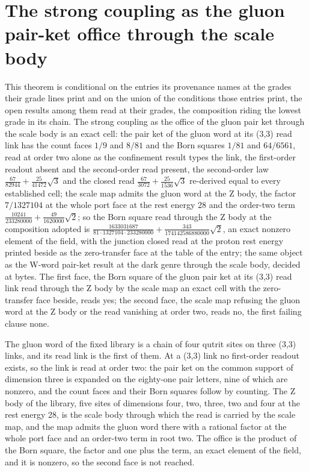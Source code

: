 \section{The strong coupling as the gluon pair-ket office through the scale body}\label{mod:V-7-D539977-aszb-t1}
\begin{chconditional}\label{box:V-7-D539977-aszb-t1:1}
This theorem is conditional on the entries its provenance names at the grades their grade lines print and on the union of the conditions those entries print, the open results among them read at their grades, the composition riding the lowest grade in its chain. The strong coupling as the office of the gluon pair ket through the scale body is an exact cell: the pair ket of the gluon word at its (3,3) read link has the count faces $1/9$ and $8/81$ and the Born squares $1/81$ and $64/6561$, read at order two alone as the confinement result types the link, the first-order readout absent and the second-order read present, the second-order law $\tfrac{67}{82944} + \tfrac{25}{41472}\sqrt{3}$ and the closed read $\tfrac{67}{3072} + \tfrac{25}{1536}\sqrt{3}$ re-derived equal to every established cell; the scale map admits the gluon word at the Z body, the factor $7/1327104$ at the whole port face at the rest energy 28 and the order-two term $\tfrac{10241}{233280000} + \tfrac{49}{1620000}\sqrt{2}$; so the Born square read through the Z body at the composition adopted is $\tfrac{1633031687}{81\cdot 1327104\cdot 233280000} + \tfrac{343}{174142586880000}\sqrt{2}$, an exact nonzero element of the field, with the junction closed read at the proton rest energy printed beside as the zero-transfer face at the table of the entry; the same object as the W-word pair-ket result at the dark genre through the scale body, decided at bytes.
The first face, the Born square of the gluon pair ket at its (3,3) read link read through the Z body by the scale map an exact cell with the zero-transfer face beside, reads yes; the second face, the scale map refusing the gluon word at the Z body or the read vanishing at order two, reads no, the first failing clause none.
\end{chconditional}
The gluon word of the fixed library is a chain of four qutrit sites on three (3,3) links, and its read link is the first of them. At a (3,3) link no first-order readout exists, so the link is read at order two: the pair ket on the common support of dimension three is expanded on the eighty-one pair letters, nine of which are nonzero, and the count faces and their Born squares follow by counting. The Z body of the library, five sites of dimensions four, two, three, two and four at the rest energy 28, is the scale body through which the read is carried by the scale map, and the map admits the gluon word there with a rational factor at the whole port face and an order-two term in root two. The office is the product of the Born square, the factor and one plus the term, an exact element of the field, and it is nonzero, so the second face is not reached.
